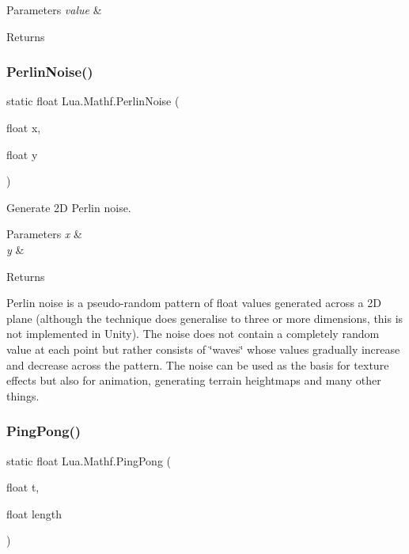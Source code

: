 \begin{DoxyParams}{Parameters}
{\em value} & \\
\hline
\end{DoxyParams}
\begin{DoxyReturn}{Returns}

\end{DoxyReturn}
\mbox{\label{class_lua_1_1_mathf_a3044ff5b1dd835169520fd054c713d63}} 
\subsubsection{\texorpdfstring{PerlinNoise()}{PerlinNoise()}}
{\footnotesize\ttfamily static float Lua.\+Mathf.\+Perlin\+Noise (\begin{DoxyParamCaption}\item[{float}]{x,  }\item[{float}]{y }\end{DoxyParamCaption})\hspace{0.3cm}{\ttfamily [static]}}



Generate 2D Perlin noise. 


\begin{DoxyParams}{Parameters}
{\em x} & \\
\hline
{\em y} & \\
\hline
\end{DoxyParams}
\begin{DoxyReturn}{Returns}

\end{DoxyReturn}
Perlin noise is a pseudo-\/random pattern of float values generated across a 2D plane (although the technique does generalise to three or more dimensions, this is not implemented in Unity). The noise does not contain a completely random value at each point but rather consists of \char`\"{}waves\char`\"{} whose values gradually increase and decrease across the pattern. The noise can be used as the basis for texture effects but also for animation, generating terrain heightmaps and many other things. \mbox{\label{class_lua_1_1_mathf_a8eed89df943f9dc0df1398e541e023ad}} 
\subsubsection{\texorpdfstring{PingPong()}{PingPong()}}
{\footnotesize\ttfamily static float Lua.\+Mathf.\+Ping\+Pong (\begin{DoxyParamCaption}\item[{float}]{t,  }\item[{float}]{length }\end{DoxyParamCaption})\hspace{0.3cm}{\ttfamily [static]}}



